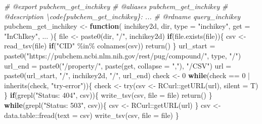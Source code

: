 \documentclass[
]{article}
\newenvironment{Shaded}{\begin{snugshade}}{\end{snugshade}}
\newcommand{\AttributeTok}[1]{\textcolor[rgb]{0.77,0.63,0.00}{#1}}
\newcommand{\CommentTok}[1]{\textcolor[rgb]{0.56,0.35,0.01}{\textit{#1}}}
\newcommand{\ControlFlowTok}[1]{\textcolor[rgb]{0.13,0.29,0.53}{\textbf{#1}}}
\newcommand{\DecValTok}[1]{\textcolor[rgb]{0.00,0.00,0.81}{#1}}
\newcommand{\FunctionTok}[1]{\textcolor[rgb]{0.00,0.00,0.00}{#1}}
\newcommand{\NormalTok}[1]{#1}
\newcommand{\OtherTok}[1]{\textcolor[rgb]{0.56,0.35,0.01}{#1}}
\newcommand{\SpecialCharTok}[1]{\textcolor[rgb]{0.00,0.00,0.00}{#1}}
\newcommand{\StringTok}[1]{\textcolor[rgb]{0.31,0.60,0.02}{#1}}
\begin{document}
\begin{Shaded}
\begin{Highlighting}[]
\CommentTok{\#\textquotesingle{} @export pubchem\_get\_inchikey}
\CommentTok{\#\textquotesingle{} @aliases pubchem\_get\_inchikey}
\CommentTok{\#\textquotesingle{} @description \textbackslash{}code\{pubchem\_get\_inchikey\}: ...}
\CommentTok{\#\textquotesingle{} @rdname query\_inchikey}
\NormalTok{pubchem\_get\_inchikey }\OtherTok{\textless{}{-}} 
  \ControlFlowTok{function}\NormalTok{(}
\NormalTok{    inchikey2d,}
\NormalTok{    dir,}
    \AttributeTok{type =} \StringTok{"inchikey"}\NormalTok{,}
    \AttributeTok{get =} \StringTok{"InChIkey"}\NormalTok{,}
\NormalTok{    ...}
\NormalTok{    )\{}
\NormalTok{    file }\OtherTok{\textless{}{-}} \FunctionTok{paste0}\NormalTok{(dir, }\StringTok{"/"}\NormalTok{, inchikey2d)}
    \ControlFlowTok{if}\NormalTok{(}\FunctionTok{file.exists}\NormalTok{(file))\{}
\NormalTok{      csv }\OtherTok{\textless{}{-}} \FunctionTok{read\_tsv}\NormalTok{(file)}
      \ControlFlowTok{if}\NormalTok{(}\StringTok{"CID"} \SpecialCharTok{\%in\%} \FunctionTok{colnames}\NormalTok{(csv))}
        \FunctionTok{return}\NormalTok{()}
\NormalTok{    \}}
\NormalTok{    url\_start }\OtherTok{=} \FunctionTok{paste0}\NormalTok{(}\StringTok{"https://pubchem.ncbi.nlm.nih.gov/rest/pug/compound/"}\NormalTok{, type, }\StringTok{"/"}\NormalTok{)}
\NormalTok{    url\_end }\OtherTok{=} \FunctionTok{paste0}\NormalTok{(}\StringTok{"/property/"}\NormalTok{, }\FunctionTok{paste}\NormalTok{(get, }\AttributeTok{collapse =} \StringTok{","}\NormalTok{), }\StringTok{"/CSV"}\NormalTok{)}
\NormalTok{    url }\OtherTok{=} \FunctionTok{paste0}\NormalTok{(url\_start, }\StringTok{"/"}\NormalTok{, inchikey2d, }\StringTok{"/"}\NormalTok{, url\_end)}
\NormalTok{    check }\OtherTok{\textless{}{-}} \DecValTok{0}
    \ControlFlowTok{while}\NormalTok{(check }\SpecialCharTok{==} \DecValTok{0} \SpecialCharTok{|} \FunctionTok{inherits}\NormalTok{(check, }\StringTok{"try{-}error"}\NormalTok{))\{}
\NormalTok{      check }\OtherTok{\textless{}{-}} \FunctionTok{try}\NormalTok{(csv }\OtherTok{\textless{}{-}}\NormalTok{ RCurl}\SpecialCharTok{::}\FunctionTok{getURL}\NormalTok{(url), }\AttributeTok{silent =}\NormalTok{ T)}
\NormalTok{    \}}
    \ControlFlowTok{if}\NormalTok{(}\FunctionTok{grepl}\NormalTok{(}\StringTok{"Status: 404"}\NormalTok{, csv))\{}
      \FunctionTok{write\_tsv}\NormalTok{(csv, }\AttributeTok{file =}\NormalTok{ file)}
      \FunctionTok{return}\NormalTok{()}
\NormalTok{    \}}
    \ControlFlowTok{while}\NormalTok{(}\FunctionTok{grepl}\NormalTok{(}\StringTok{"Status:    503"}\NormalTok{, csv))\{}
\NormalTok{      csv }\OtherTok{\textless{}{-}}\NormalTok{ RCurl}\SpecialCharTok{::}\FunctionTok{getURL}\NormalTok{(url)}
\NormalTok{    \}}
\NormalTok{    csv }\OtherTok{\textless{}{-}}\NormalTok{ data.table}\SpecialCharTok{::}\FunctionTok{fread}\NormalTok{(}\AttributeTok{text =}\NormalTok{ csv)}
    \FunctionTok{write\_tsv}\NormalTok{(csv, }\AttributeTok{file =}\NormalTok{ file)}
\NormalTok{  \}}
\end{Highlighting}
\end{Shaded}
\end{document}
